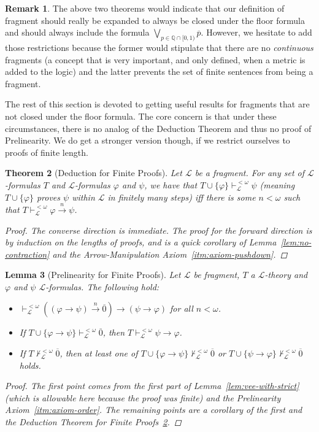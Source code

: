 \documentclass{amsart}
\newtheorem{theorem}{Theorem}[section]
\newtheorem{lemma}[theorem]{Lemma}
\theoremstyle{definition}
\newtheorem{remark}[theorem]{Remark}
\numberwithin{equation}{theorem}
\renewcommand{\phi}{\varphi}
\newcommand{\Q}{\mathbb{Q}}
\newcommand{\proves}{\vdash}
\newcommand{\rat}[1]{{\overline{#1}}}
\newcommand{\narrow}[1]{\xrightarrow{#1}}
\renewcommand{\to}{\narrow{}}
\newcommand{\frag}{\mathcal{L}}
\begin{document}
\begin{remark}
  The above two theorems would indicate that our definition of fragment should really be expanded to always be closed under the floor formula and should always include the formula $\bigvee_{p\in\Q\cap[0,1)}\rat p$.
  However, we hesitate to add those restrictions because the former would stipulate that there are no \emph{continuous} fragments (a concept that is very important, and only defined, when a metric is added to the logic) and the latter prevents the set of finite sentences from being a fragment.
\end{remark}
The rest of this section is devoted to getting useful results for fragments that are not closed under the floor formula.
The core concern is that under these circumstances, there is no analog of the Deduction Theorem and thus no proof of Prelinearity.
We do get a stronger version though, if we restrict ourselves to proofs of finite length.
\begin{theorem}[Deduction for Finite Proofs]\label{thm:deduction-finite}
  Let $\frag$ be a fragment.
  For any set of $\frag$-formulas $T$ and $\frag$-formulas $\phi$ and $\psi$, we have that $T\cup\{\phi\}\proves_\frag^{<\omega}\psi$ (meaning $T\cup\{\phi\}$ proves $\psi$ within $\frag$ in finitely many steps) iff there is some $n<\omega$ such that $T\proves_\frag^{<\omega}\phi\narrow{n}\psi$.
  \begin{proof}
      The converse direction is immediate.
      The proof for the forward direction is by induction on the lengths of proofs, and is a quick corollary of Lemma~\ref{lem:no-contraction} and the Arrow-Manipulation Axiom~\ref{itm:axiom-pushdown}.
  \end{proof}
\end{theorem}
\begin{lemma}[Prelinearity for Finite Proofs]\label{lem:prelinearity-finite}
  Let $\frag$ be fragment, $T$ a $\frag$-theory and $\phi$ and $\psi$ $\frag$-formulas.
  The following hold:
  \begin{itemize}
  \item $\proves^{<\omega}_\frag((\phi\to\psi)\narrow{n}\rat 0)\to(\psi\to\phi)$ for all $n<\omega$.
  \item If $T\cup\{\phi\to\psi\}\proves^{<\omega}_\frag\rat 0$, then $T\proves^{<\omega}_\frag\psi\to\phi$.
  \item If $T\not\proves^{<\omega}_\frag\rat 0$, then at least one of $T\cup\{\phi\to\psi\}\not\proves^{<\omega}_\frag\rat 0$ or $T\cup\{\psi\to\phi\}\not\proves^{<\omega}_\frag\rat 0$ holds.
  \end{itemize}
  \begin{proof}
    The first point comes from the first part of Lemma~\ref{lem:vee-with-strict} (which is allowable here because the proof was finite) and the Prelinearity Axiom~\ref{itm:axiom-order}.
    The remaining points are a corollary of the first and the Deduction Theorem for Finite Proofs~\ref{thm:deduction-finite}.
  \end{proof}
\end{lemma}
\end{document}
